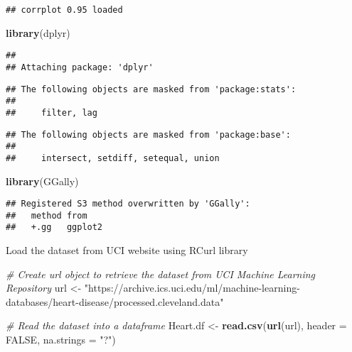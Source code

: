 \documentclass[
]{article}
\newenvironment{Shaded}{\begin{snugshade}}{\end{snugshade}}
\newcommand{\AttributeTok}[1]{\textcolor[rgb]{0.13,0.29,0.53}{#1}}
\newcommand{\CommentTok}[1]{\textcolor[rgb]{0.56,0.35,0.01}{\textit{#1}}}
\newcommand{\ConstantTok}[1]{\textcolor[rgb]{0.56,0.35,0.01}{#1}}
\newcommand{\FunctionTok}[1]{\textcolor[rgb]{0.13,0.29,0.53}{\textbf{#1}}}
\newcommand{\NormalTok}[1]{#1}
\newcommand{\OtherTok}[1]{\textcolor[rgb]{0.56,0.35,0.01}{#1}}
\newcommand{\StringTok}[1]{\textcolor[rgb]{0.31,0.60,0.02}{#1}}
\begin{document}
\begin{verbatim}
## corrplot 0.95 loaded
\end{verbatim}

\begin{Shaded}
\begin{Highlighting}[]
\FunctionTok{library}\NormalTok{(dplyr)}
\end{Highlighting}
\end{Shaded}

\begin{verbatim}
## 
## Attaching package: 'dplyr'
\end{verbatim}

\begin{verbatim}
## The following objects are masked from 'package:stats':
## 
##     filter, lag
\end{verbatim}

\begin{verbatim}
## The following objects are masked from 'package:base':
## 
##     intersect, setdiff, setequal, union
\end{verbatim}

\begin{Shaded}
\begin{Highlighting}[]
\FunctionTok{library}\NormalTok{(GGally)}
\end{Highlighting}
\end{Shaded}

\begin{verbatim}
## Registered S3 method overwritten by 'GGally':
##   method from   
##   +.gg   ggplot2
\end{verbatim}

Load the dataset from UCI website using RCurl library

\begin{Shaded}
\begin{Highlighting}[]
\CommentTok{\# Create url object to retrieve the dataset from UCI Machine Learning Repository}
\NormalTok{url }\OtherTok{\textless{}{-}} \StringTok{"https://archive.ics.uci.edu/ml/machine{-}learning{-}databases/heart{-}disease/processed.cleveland.data"}

\CommentTok{\# Read the dataset into a dataframe}
\NormalTok{Heart.df }\OtherTok{\textless{}{-}} \FunctionTok{read.csv}\NormalTok{(}\FunctionTok{url}\NormalTok{(url), }\AttributeTok{header =} \ConstantTok{FALSE}\NormalTok{, }\AttributeTok{na.strings =} \StringTok{"?"}\NormalTok{)}
\end{Highlighting}
\end{Shaded}
\end{document}
